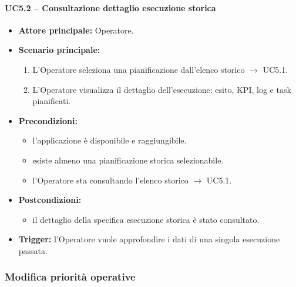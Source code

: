 \paragraph{UC5.2 -- Consultazione dettaglio esecuzione storica}
\begin{itemize}
    \item \textbf{Attore principale:} Operatore.
    \item \textbf{Scenario principale:}
    \begin{enumerate}
        \item L'Operatore seleziona una pianificazione dall'elenco storico $\rightarrow$ UC5.1.
        \item L'Operatore visualizza il dettaglio dell'esecuzione: esito, KPI, log e task pianificati.
    \end{enumerate}
    \item \textbf{Precondizioni:}
    \begin{itemize}
        \item l'applicazione è disponibile e raggiungibile.
        \item esiste almeno una pianificazione storica selezionabile.
        \item l'Operatore sta consultando l'elenco storico $\rightarrow$ UC5.1.
    \end{itemize}
    \item \textbf{Postcondizioni:}
    \begin{itemize}
        \item il dettaglio della specifica esecuzione storica è stato consultato.
    \end{itemize}
    \item \textbf{Trigger:} l'Operatore vuole approfondire i dati di una singola esecuzione passata.
\end{itemize}

\subsubsection{Modifica priorità operative}

